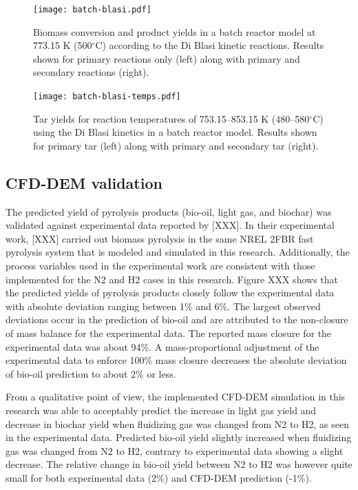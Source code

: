 \begin{figure}[H]
    \centering
    \texttt{[image: batch-blasi.pdf]}
    \caption{Biomass conversion and product yields in a batch reactor model at 773.15 K (500$^\circ$C) according to the Di Blasi kinetic reactions. Results shown for primary reactions only (left) along with primary and secondary reactions (right).}
    \label{fig:batch-blasi}
\end{figure}

\begin{figure}[H]
    \centering
    \texttt{[image: batch-blasi-temps.pdf]}
    \caption{Tar yields for reaction temperatures of 753.15--853.15 K (480--580$^\circ$C) using the Di Blasi kinetics in a batch reactor model. Results shown for primary tar (left) along with primary and secondary tar (right).}
    \label{fig:batch-blasi-temps}
\end{figure}


\subsection{CFD-DEM validation}

The predicted yield of pyrolysis products (bio-oil, light gas, and biochar) was validated against experimental data reported by [XXX]. In their experimental work, [XXX] carried out biomass pyrolysis in the same NREL 2FBR fast pyrolysis system that is modeled and simulated in this research. Additionally, the process variables used in the experimental work are consistent with those implemented for the N2 and H2 cases in this research. Figure XXX shows that the predicted yields of pyrolysis products closely follow the experimental data with absolute deviation ranging between 1\% and 6\%. The largest observed deviations occur in the prediction of bio-oil and are attributed to the non-closure of mass balance for the experimental data. The reported mass closure for the experimental data was about 94\%. A mass-proportional adjustment of the experimental data to enforce 100\% mass closure decreases the absolute deviation of bio-oil prediction to about 2\% or less.

From a qualitative point of view, the implemented CFD-DEM simulation in this research was able to acceptably predict the increase in light gas yield and decrease in biochar yield when fluidizing gas was changed from N2 to H2, as seen in the experimental data. Predicted bio-oil yield slightly increased when fluidizing gas was changed from N2 to H2, contrary to experimental data showing a slight decrease. The relative change in bio-oil yield between N2 to H2 was however quite small for both experimental data (2\%) and CFD-DEM prediction (-1\%).

